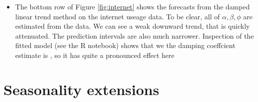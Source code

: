 \documentclass{article}
\begin{document}
\begin{itemize}
\item The bottom row of Figure \ref{fig:internet} shows the forecasts from the
  damped linear trend method on the internet useage data. To be clear, all of 
  $\alpha,\beta,\phi$ are estimated from the data. We can see a weak downward
  trend, that is quickly attenuated. The prediction intervals are also much 
  narrower. Inspection of the fitted model (see the R notebook) shows that we
  the damping coeffcient estimate is , so it has
  quite a pronounced effect here
\end{itemize}

\section{Seasonality extensions}
\end{document}
